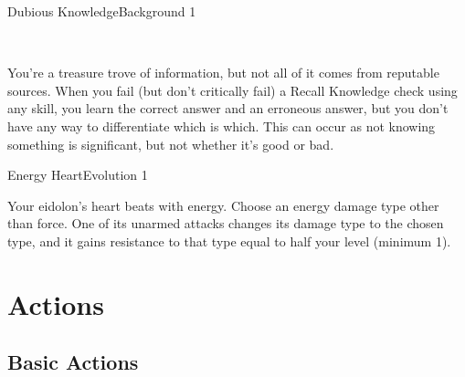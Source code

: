 \documentclass[12pt,openany,twocolumn]{book}
\begin{document}
\begin{feat}{Dubious Knowledge}{Background 1}
    \begin{featinfo}
         \\
    \end{featinfo}

    \begin{featbody}
        You're a treasure trove of information, but not all of it comes from reputable sources. When you fail (but don't critically fail) a Recall Knowledge check using any skill, you learn the correct answer and an erroneous answer, but you don't have any way to differentiate which is which. This can occur as not knowing something is significant, but not whether it's good or bad.
    \end{featbody}
\end{feat}

\begin{feat}{Energy Heart}{Evolution 1}
    \begin{featinfo}
    \end{featinfo}

    \begin{featbody}
        Your eidolon's heart beats with energy. Choose an energy damage type other than force. One of its unarmed attacks changes its damage type to the chosen type, and it gains resistance to that type equal to half your level (minimum 1).
    \end{featbody}

\end{feat}


\chapter*{Actions}

\section*{Basic Actions}
\end{document}
